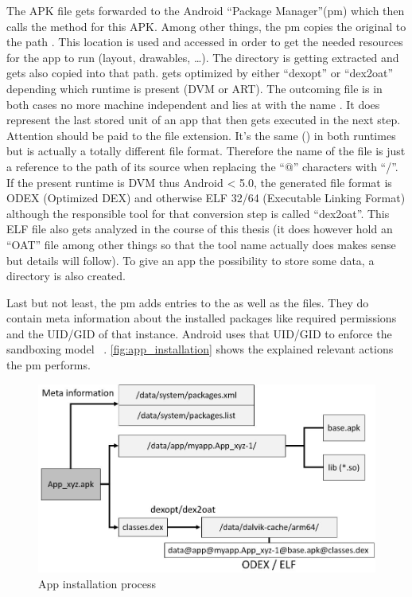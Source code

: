The APK file gets forwarded to the Android ``Package Manager''(pm)
which then calls the  method for this
APK. Among other things, the pm copies the original 
to the path .
This location is used and accessed in order to get the
needed resources for the app to run (layout, drawables, \ldots).
The  directory is getting extracted and gets also copied
into that path.  gets optimized by either ``dexopt''
or ``dex2oat'' depending which runtime is present (DVM or ART).
The outcoming file is in both cases no more machine independent
and lies at  with the name
.
It does represent the last stored unit of an app that then
gets executed in the next step.
Attention should be paid to the file extension.
It's the same () in both runtimes but is actually a totally
different file format.
Therefore the name of the file is just a reference to the path
of its source when replacing the ``@'' characters with ``/''.
If the present runtime is DVM thus Android < 5.0, the generated
file format is ODEX (Optimized DEX) and otherwise
ELF 32/64 (Executable Linking Format) although the responsible
tool for that conversion step is called ``dex2oat''. This ELF
file also gets analyzed in the course of this thesis
(it does however hold an ``OAT'' file among other things so that
the tool name actually does makes sense but details will follow).
To give an app the possibility to
store some data, a  directory is
also created.

Last but not least, the pm adds entries to the
 as well as the
 files. They do contain
meta information about the installed packages like
required permissions and the UID/GID of that instance.
Android uses that UID/GID to enforce the sandboxing model
~\parencite[ch.1]{securityinternals}.
\autoref{fig:app_installation} shows the explained
relevant actions the pm performs.

\begin{figure}[htb]
  \includegraphics[width=\textwidth]{figures/app_installation}
  \caption[App installation process]{App installation process}
  \label{fig:app_installation}
\end{figure}

